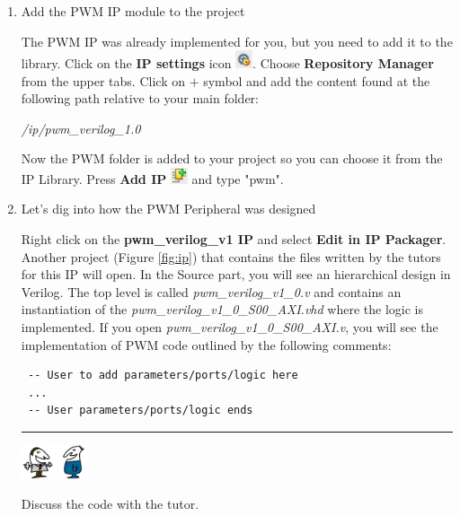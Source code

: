 \documentclass{article}
\begin{document}
\begin{enumerate}

\item Add the PWM IP module to the project

The PWM IP was already implemented for you, but you need to add it to the library. Click on the \textbf{IP settings} icon \includegraphics[width = 0.5cm]{img/settingsicon.png}.
 Choose \textbf{Repository Manager} from the upper tabs. Click on $+$ symbol and add the content found at the following path relative to your main folder:
 
 \textit{/ip/pwm\_verilog\_1.0}



Now the PWM folder is added to your project so you can choose it from the IP Library. Press \textbf{Add IP} \includegraphics[width = 0.5cm]{img/icon_add.png} and type "pwm".


\item Let's dig into how the PWM Peripheral was designed

Right click on the \textbf{pwm\_verilog\_v1 IP} and select \textbf{Edit in IP Packager}. Another project (Figure \ref{fig:ip}) that contains the files written by the tutors for this IP will open.  In the Source part, you will see an hierarchical design in Verilog. 
The top level is called \textit{pwm\_verilog\_v1\_0.v} and contains an instantiation of the  \textit{pwm\_verilog\_v1\_0\_S00\_AXI.vhd} where the logic is implemented. If you open  \textit{pwm\_verilog\_v1\_0\_S00\_AXI.v}, you will see the implementation of PWM code outlined by the following comments:



\begin{verbatim}
 -- User to add parameters/ports/logic here
 ...
 -- User parameters/ports/logic ends
\end{verbatim}

\noindent\rule{16.5cm}{1pt}

\noindent\begin{minipage}{.1\textwidth}
  \centering
  \includegraphics[height=1cm]{img/talking_icon.png}
\end{minipage}
\begin{minipage}{.8\textwidth}
\hspace{0.2cm} Discuss the code with the tutor.
\end{minipage}%


\end{enumerate}
\end{document}
